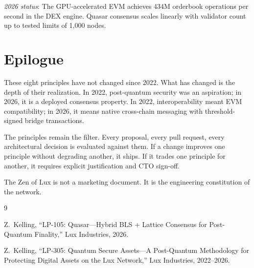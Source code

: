 \documentclass[11pt,a4paper]{article}
\begin{document}
\medskip\noindent\textit{2026 status}: The GPU-accelerated EVM achieves
434M orderbook operations per second in the DEX engine. Quasar consensus
scales linearly with validator count up to tested limits of 1,000 nodes.

\section{Epilogue}

These eight principles have not changed since 2022. What has changed is
the depth of their realization. In 2022, post-quantum security was an
aspiration; in 2026, it is a deployed consensus property. In 2022,
interoperability meant EVM compatibility; in 2026, it means native
cross-chain messaging with threshold-signed bridge transactions.

The principles remain the filter. Every proposal, every pull request,
every architectural decision is evaluated against them. If a change
improves one principle without degrading another, it ships. If it
trades one principle for another, it requires explicit justification
and CTO sign-off.

The Zen of Lux is not a marketing document. It is the engineering
constitution of the network.



\begin{thebibliography}{9}

Z.~Kelling, ``LP-105: Quasar---Hybrid BLS + Lattice Consensus for
Post-Quantum Finality,'' Lux Industries, 2026.

Z.~Kelling, ``LP-305: Quantum Secure Assets---A Post-Quantum
Methodology for Protecting Digital Assets on the Lux Network,''
Lux Industries, 2022--2026.

\end{thebibliography}
\end{document}
